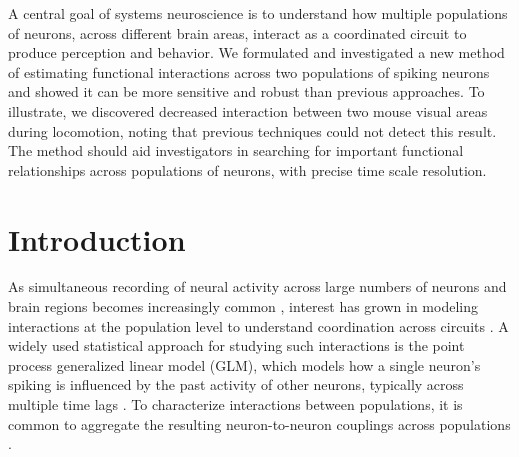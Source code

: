 \documentclass[12pt]{article}
\begin{document}
A central goal of systems neuroscience is to understand how multiple populations of neurons, across different brain areas, interact as a coordinated circuit to produce perception and behavior. We formulated and investigated a new method of estimating functional interactions across two populations of spiking neurons and showed it can be more sensitive and robust than previous approaches. To illustrate, we discovered decreased interaction between two mouse visual areas during locomotion, noting that previous techniques could not detect this result. The method should aid investigators in searching for important functional relationships across populations of neurons, with precise time scale resolution.

\section{Introduction}

As simultaneous recording of neural activity across large numbers of neurons and brain regions becomes increasingly common \cite{jun2017fully, siegle2021survey, steinmetz2021neuropixels, machado2022multiregion}, interest has grown in modeling interactions at the population level to understand coordination across circuits \cite{kass2023identification, kang2020approaches, semedo2020statistical}. A widely used statistical approach for studying such interactions is the point process generalized linear model (GLM), which models how a single neuron’s spiking is influenced by the past activity of other neurons, typically across multiple time lags \cite{kass2023identification, keeley2020modeling}. To characterize interactions between populations, it is common to aggregate the resulting neuron-to-neuron couplings across populations \cite{yates2017functional, hart2020recurrent, zoltowski2018scaling, stevenson2008bayesian}.
\end{document}
